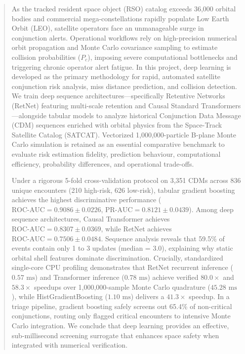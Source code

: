 \documentclass[conference]{IEEEtran}
\begin{document}
\begin{abstract}
As the tracked resident space object (RSO) catalog exceeds 36,000 orbital bodies and commercial mega-constellations rapidly populate Low Earth Orbit (LEO), satellite operators face an unmanageable surge in conjunction alerts. Operational workflows rely on high-precision numerical orbit propagation and Monte Carlo covariance sampling to estimate collision probabilities ($P_c$), imposing severe computational bottlenecks and triggering chronic operator alert fatigue. In this project, deep learning is developed as the primary methodology for rapid, automated satellite conjunction risk analysis, miss distance prediction, and collision detection. We train deep sequence architectures---specifically Retentive Networks (RetNet) featuring multi-scale retention and Causal Standard Transformers---alongside tabular models to analyze historical Conjunction Data Message (CDM) sequences enriched with orbital physics from the Space-Track Satellite Catalog (SATCAT). Vectorized 1,000,000-particle B-plane Monte Carlo simulation is retained as an essential comparative benchmark to evaluate risk estimation fidelity, prediction behaviour, computational efficiency, probability differences, and operational trade-offs.

Under a rigorous 5-fold cross-validation protocol on 3,351 CDMs across 836 unique encounters (210 high-risk, 626 low-risk), tabular gradient boosting achieves the highest discriminative performance ($\text{ROC-AUC} = 0.9086 \pm 0.0226$, $\text{PR-AUC} = 0.8121 \pm 0.0439$). Among deep sequence architectures, Causal Transformer achieves $\text{ROC-AUC} = 0.8307 \pm 0.0369$, while RetNet achieves $\text{ROC-AUC} = 0.7506 \pm 0.0484$. Sequence analysis reveals that 59.5\% of events contain only 1 to 3 updates (median = 3.0), explaining why static orbital shell features dominate discrimination. Crucially, standardized single-core CPU profiling demonstrates that RetNet recurrent inference ($0.57\text{ ms}$) and Transformer inference ($0.78\text{ ms}$) achieve verified $80.0\times$ and $58.3\times$ speedups over 1,000,000-sample Monte Carlo quadrature ($45.28\text{ ms}$), while HistGradientBoosting ($1.10\text{ ms}$) delivers a $41.3\times$ speedup. In a triage pipeline, gradient boosting safely screens out 65.4\% of non-critical conjunctions, routing only flagged critical encounters to intensive Monte Carlo integration. We conclude that deep learning provides an effective, sub-millisecond screening surrogate that enhances space safety when integrated with numerical verification.
\end{abstract}
\end{document}
